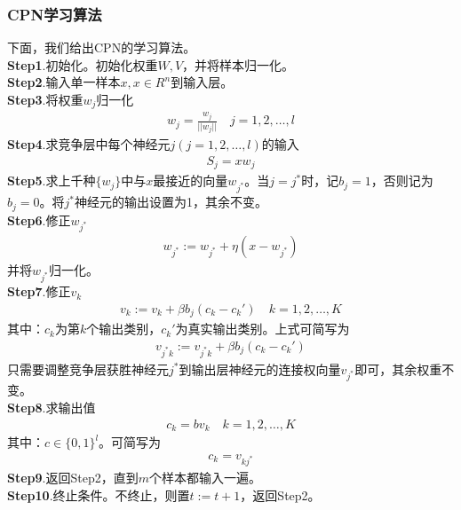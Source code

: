         \subsubsection{CPN学习算法}
            \par
            下面，我们给出CPN的学习算法。\\
            \textbf{Step1}.初始化。初始化权重$W,V$，并将样本归一化。\\
            \textbf{Step2}.输入单一样本$x,x\in R^n$到输入层。\\
            \textbf{Step3}.将权重$w_j$归一化
            \begin{align*}
            w_j = \frac{w_j}{||w_j||} \quad j=1,2,\dots,l
            \end{align*}
            \textbf{Step4}.求竞争层中每个神经元$j(j =1,2,\dots,l)$的输入
            \begin{align*}
            S_j = xw_j
            \end{align*}
            \textbf{Step5}.求上千种$\{w_j\}$中与$x$最接近的向量$w_{j^*}$。当$j = j^*$时，记$b_j = 1$，否则记为$b_j=0$。将$j^*$神经元的输出设置为1，其余不变。\\
            \textbf{Step6}.修正$w_{j^*}$
            \begin{align*}
            w_{j^*} := w_{j^*} + \eta(x-w_{j^*})
            \end{align*}
            并将$w_{j^*}$归一化。\\
            \textbf{Step7}.修正$v_k$
            \begin{align*}
            v_k:=v_k + \beta b_j(c_k - c_k') \quad k=1,2,\dots,K
            \end{align*}
            其中：$c_k$为第$k$个输出类别，$c_k'$为真实输出类别。上式可简写为
            \begin{align*}
            v_{j^*k}:=v_{j^*k} + \beta b_j(c_k - c_k')
            \end{align*}
            只需要调整竞争层获胜神经元$j^*$到输出层神经元的连接权向量$v_{j^*}$即可，其余权重不变。\\
            \textbf{Step8}.求输出值
            \begin{align*}
            c_k = bv_k \quad k=1,2,\dots,K
            \end{align*}
            其中：$c\in \{0,1\}^l$。可简写为
            \begin{align*}
            c_k = v_{kj^*}
            \end{align*}
            \textbf{Step9}.返回Step2，直到$m$个样本都输入一遍。\\
            \textbf{Step10}.终止条件。不终止，则置$t:=t+1$，返回Step2。

